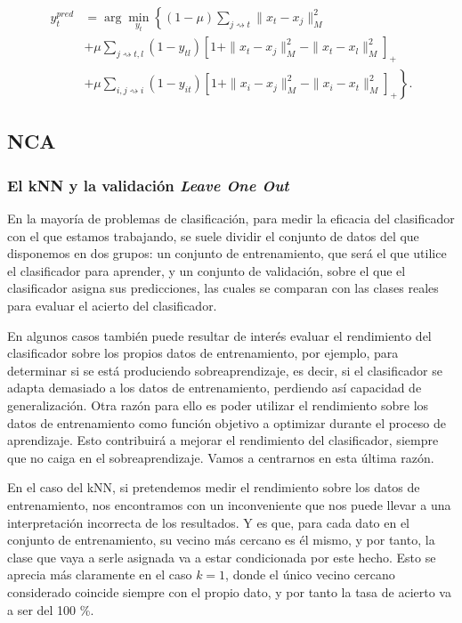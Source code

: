 \documentclass{book}
\newcommand{\istargetof}{\rightsquigarrow}
\begin{document}
\begin{equation}
\begin{split}
 y_t^{pred} &= \arg\min_{y_t} \left\{ (1-\mu) \sum_{j \istargetof t} \|x_t-x_j\|_M^2 \right. \\
            &+ \mu \sum_{j \istargetof t,l} (1-y_{tl})\left[ 1 + \|x_t-x_j\|_M^2 - \|x_t-x_l\|_M^2\right]_+  \\
            &+ \left. \mu \sum_{i,j \istargetof i}(1 - y_{it}) \left[ 1 + \|x_i-x_j\|_M^2 - \|x_i-x_t\|_M^2\right]_+ \right\} .
\end{split}
\end{equation}

\subsection{NCA}

\subsubsection{El kNN y la validación \emph{Leave One Out}}

En la mayoría de problemas de clasificación, para medir la eficacia del clasificador con el que estamos trabajando, se suele dividir el conjunto de datos del que disponemos en dos grupos: un conjunto de entrenamiento, que será el que utilice el clasificador para aprender, y un conjunto de validación, sobre el que el clasificador asigna sus predicciones, las cuales se comparan con las clases reales para evaluar el acierto del clasificador.

En algunos casos también puede resultar de interés evaluar el rendimiento del clasificador sobre los propios datos de entrenamiento, por ejemplo, para determinar si se está produciendo sobreaprendizaje, es decir, si el clasificador se adapta demasiado a los datos de entrenamiento, perdiendo así capacidad de generalización. Otra razón para ello es poder utilizar el rendimiento sobre los datos de entrenamiento como función objetivo a optimizar durante el proceso de aprendizaje. Esto contribuirá a mejorar el rendimiento del clasificador, siempre que no caiga en el sobreaprendizaje. Vamos a centrarnos en esta última razón.

En el caso del kNN, si pretendemos medir el rendimiento sobre los datos de entrenamiento, nos encontramos con un inconveniente que nos puede llevar a una interpretación incorrecta de los resultados. Y es que, para cada dato en el conjunto de entrenamiento, su vecino más cercano es él mismo, y por tanto, la clase que vaya a serle asignada va a estar condicionada por este hecho. Esto se aprecia más claramente en el caso $k=1$, donde el único vecino cercano considerado coincide siempre con el propio dato, y por tanto la tasa de acierto va a ser del 100 \%.
\end{document}
